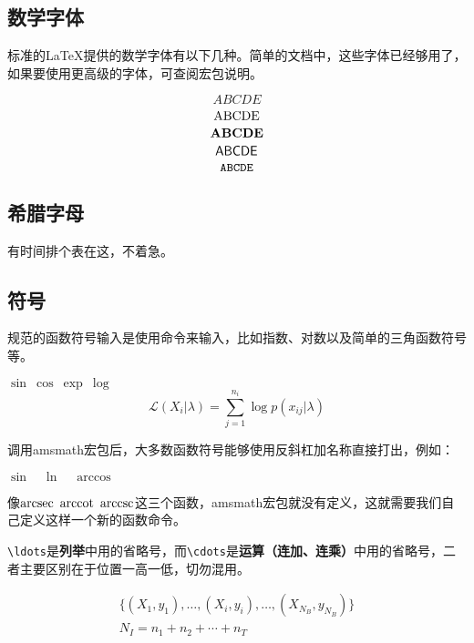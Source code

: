 \subsection{数学字体}
标准的\LaTeX 提供的数学字体有以下几种。简单的文档中，这些字体已经够用了，如果要使用更高级的字体，可查阅\CTeX 宏包说明。
\begin{codeshow}
\[
\mathit{ABCDE}\]
\[
\mathrm{ABCDE}\\\]
\[
\mathbf{ABCDE}\\\]
\[
\mathsf{ABCDE}\\\]
\[
\mathtt{ABCDE}\\\]
\end{codeshow}

\subsection{希腊字母}
有时间排个表在这，不着急。

\subsection{符号}
规范的函数符号输入是使用命令来输入，比如指数、对数以及简单的三角函数符号等。

\begin{codeshow}
$ \sin~\cos~\exp~\log $\\
\[\mathcal{L}(X_i|\lambda) = \sum\limits_{j=1}^{n_i}\log p(x_{ij}|\lambda) \]
\end{codeshow}

调用amsmath宏包后，大多数函数符号能够使用反斜杠加名称直接打出，例如：

\begin{codeshow}
$ \sin \quad \ln \quad \arccos $
\end{codeshow}

像$ \arcsec~\arccot~\arccsc $这三个函数，amsmath宏包就没有定义，这就需要我们自己定义这样一个新的函数命令。
\begin{latex}
\DeclareMathOperator{\arcsec}{arcsec}
\DeclareMathOperator{\arccot}{arccot}
\DeclareMathOperator{\arccsc}{arccsc}
\end{latex}


\lstinline|\ldots|是\textbf{列举}中用的省略号，而\lstinline|\cdots|是\textbf{运算（连加、连乘）}中用的省略号，二者主要区别在于位置一高一低，切勿混用。

\begin{codeshow}
\begin{gather*}
\{ (X_1,y_1), \ldots, (X_i,y_i), \ldots, (X_{N_{B}},y_{N_{B}}) \}\\
N_I=n_1 +n_2 + \cdots +n_T
\end{gather*}
\end{codeshow}

